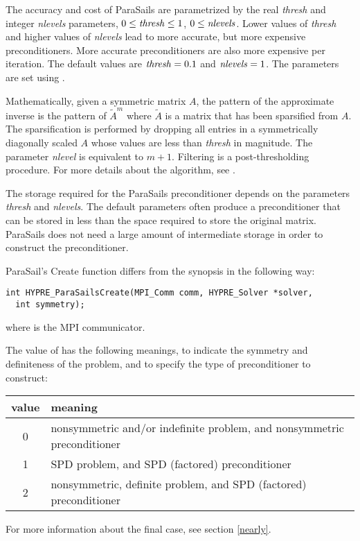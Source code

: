 The accuracy and cost of ParaSails are parametrized by the real {\em thresh}
and integer {\em nlevels} parameters,
$0 \le {\it thresh} \le 1$, $0 \le {\it nlevels}$.
Lower values of {\em thresh}
and higher values of {\em nlevels} lead to more accurate, but more expensive
preconditioners.  More accurate preconditioners are also more expensive
per iteration.  The default values are ${\it thresh} = 0.1$
and ${\it nlevels} = 1$.  The parameters are set using
.

Mathematically, given a symmetric matrix $A$, the pattern of the
approximate inverse is the pattern of $\tilde{A}^m$ where $\tilde{A}$
is a matrix that has been sparsified from $A$.  The sparsification
is performed by dropping all entries in a symmetrically diagonally scaled $A$
whose values are less than {\em thresh} in magnitude.  The parameter
{\em nlevel} is equivalent to $m+1$.
Filtering is a post-thresholding procedure.
For more details about the algorithm, see \cite{EChow_2000}.

The storage required for the ParaSails preconditioner depends on
the parameters {\em thresh} and {\em nlevels}.  The default parameters
often produce a preconditioner that can be stored in less than the
space required to store the original matrix.
ParaSails does not need a large amount of intermediate storage in
order to construct the preconditioner.


ParaSail's Create function differs from the synopsis in the following way:

\begin{display}
\begin{verbatim}
int HYPRE_ParaSailsCreate(MPI_Comm comm, HYPRE_Solver *solver,
  int symmetry);
\end{verbatim}
\end{display}
where  is the MPI communicator.

The value of  has the following meanings, to indicate
the symmetry and definiteness of the problem, and to specify the 
type of preconditioner to construct:
\begin{center}
\begin{tabular}{|c|l|} \hline
value & meaning \\ \hline
0 & nonsymmetric and/or indefinite problem, and nonsymmetric preconditioner \\
1 & SPD problem, and SPD (factored) preconditioner \\
2 & nonsymmetric, definite problem, and SPD (factored) preconditioner \\ 
\hline
\end{tabular}
\end{center}
For more information about the final case, see section \ref{nearly}.

